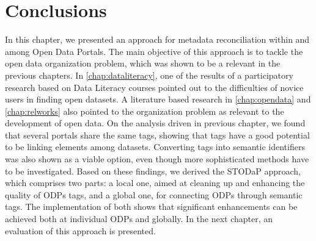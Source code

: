 \section{Conclusions}
\label{sec:stodap_conclusions}

In this chapter, we presented an approach for metadata reconciliation within and among Open Data Portals.
The main objective of this approach is to tackle the open data organization problem, which was shown to be a relevant in the previous chapters.
In \autoref{chap:dataliteracy}, one of the results of a participatory research based on Data Literacy courses pointed out to the difficulties of novice users in finding open datasets.
A literature based research in \autoref{chap:opendata} and \autoref{chap:relworks} also pointed to the organization problem as relevant to the development of open data.
On the analysis driven in previous chapter, we found that several portals share the same tags, showing that tags have a good potential to be linking elements among datasets.
Converting tags into semantic identifiers was also shown as a viable option, even though more sophisticated methods have to be investigated. 
Based on these findings, we derived the STODaP approach, which comprises two parts: 
a local one, aimed at cleaning up and enhancing the quality of ODPs tags, and 
a global one, for connecting ODPs through semantic tags.
The implementation of both shows that significant enhancements can be achieved both at individual ODPs and globally.
In the next chapter, an evaluation of this approach is presented.





